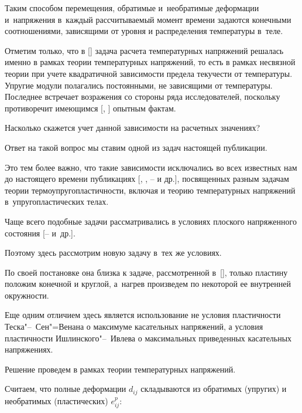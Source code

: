 Таким способом перемещения, обратимые и~необратимые деформации и~напряжения в~каждый рассчитываемый момент времени задаются конечными соотношениями, зависящими от уровня и распределения температуры в~теле. 

Отметим только, что в [] задача расчета температурных напряжений решалась именно в рамках теории температурных напряжений, то есть в рамках несвязной теории при учете квадратичной зависимости предела текучести от температуры. Упругие модули полагались постоянными, не зависящими от температуры. Последнее встречает возражения со стороны ряда исследователей, поскольку противоречит имеющимся [, ] опытным фактам.



Насколько скажется учет данной зависимости на расчетных значениях? 

Ответ на такой вопрос мы ставим одной из  задач настоящей публикации. 

Это тем более важно, что такие зависимости исключались во всех  известных нам до настоящего времени публикациях [, , -- и др.], посвященных разным задачам теории термоупругопластичности, включая и теорию температурных напряжений в~упругопластических телах. 



Чаще всего подобные задачи рассматривались  в условиях плоского напряженного состояния [-- и~др.]. 

Поэтому здесь рассмотрим новую задачу в~тех же условиях. 

По своей постановке она близка к задаче, рассмотренной в~[], только пластину положим конечной и круглой, а~нагрев произведем по некоторой ее внутренней окружности. 

Еще одним отличием здесь является  использование не  условия пластичности Теска"--~Сен"=Венана о максимуме касательных напряжений, а условия пластичности Ишлинского"--~Ивлева о максимальных приведенных касательных напряжениях. 

Решение проведем в рамках теории температурных напряжений.



\smallskip



 Считаем, что полные деформации $d_{ij} $ складываются из обратимых (упругих) и необратимых (пластических) $e_{ij}^{p} $:

